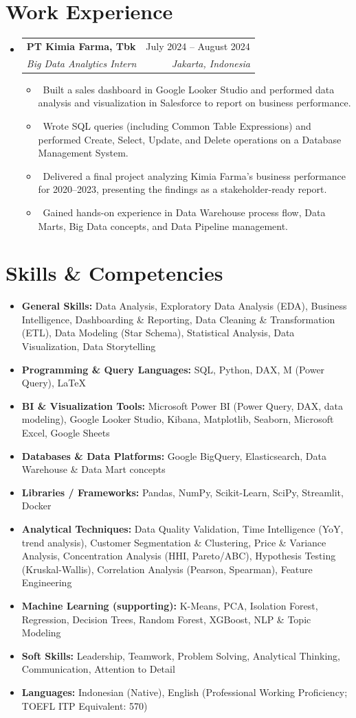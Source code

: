 \documentclass[letterpaper,10pt]{article}
\makeatletter
\newcommand{\resumeItem}[1]{\item\small{#1}}
\newcommand{\resumeSubheading}[4]{
\vspace{-1pt}\item
  \begin{tabular*}{0.97\textwidth}[t]{l@{\extracolsep{\fill}}r}
    \textbf{#1} & #2 \\
    \textit{#3} & \textit{#4} \\
  \end{tabular*}\vspace{-7pt}
}
\newcommand{\resumeSubHeadingList}{\begin{itemize}[leftmargin=0.15in, label={}]}
\newcommand{\resumeSubHeadingListEnd}{\end{itemize}}
\makeatother
\begin{document}
\section{Work Experience}
\resumeSubHeadingList
  \resumeSubheading
      {PT Kimia Farma, Tbk}{July 2024 -- August 2024}
      {Big Data Analytics Intern}{Jakarta, Indonesia}
      \resumeSubHeadingList
          \resumeItem{\textbullet\ Built a sales dashboard in Google Looker Studio and performed data analysis and visualization in Salesforce to report on business performance.}
          \resumeItem{\textbullet\ Wrote SQL queries (including Common Table Expressions) and performed Create, Select, Update, and Delete operations on a Database Management System.}
          \resumeItem{\textbullet\ Delivered a final project analyzing Kimia Farma's business performance for 2020--2023, presenting the findings as a stakeholder-ready report.}
          \resumeItem{\textbullet\ Gained hands-on experience in Data Warehouse process flow, Data Marts, Big Data concepts, and Data Pipeline management.}
      \resumeSubHeadingListEnd
\resumeSubHeadingListEnd

\section{Skills \& Competencies}
\resumeSubHeadingList
  \resumeItem{\textbf{General Skills:} Data Analysis, Exploratory Data Analysis (EDA), Business Intelligence, Dashboarding \& Reporting, Data Cleaning \& Transformation (ETL), Data Modeling (Star Schema), Statistical Analysis, Data Visualization, Data Storytelling}
  \resumeItem{\textbf{Programming \& Query Languages:} SQL, Python, DAX, M (Power Query), LaTeX}
  \resumeItem{\textbf{BI \& Visualization Tools:} Microsoft Power BI (Power Query, DAX, data modeling), Google Looker Studio, Kibana, Matplotlib, Seaborn, Microsoft Excel, Google Sheets}
  \resumeItem{\textbf{Databases \& Data Platforms:} Google BigQuery, Elasticsearch, Data Warehouse \& Data Mart concepts}
  \resumeItem{\textbf{Libraries / Frameworks:} Pandas, NumPy, Scikit-Learn, SciPy, Streamlit, Docker}
  \resumeItem{\textbf{Analytical Techniques:} Data Quality Validation, Time Intelligence (YoY, trend analysis), Customer Segmentation \& Clustering, Price \& Variance Analysis, Concentration Analysis (HHI, Pareto/ABC), Hypothesis Testing (Kruskal-Wallis), Correlation Analysis (Pearson, Spearman), Feature Engineering}
  \resumeItem{\textbf{Machine Learning (supporting):} K-Means, PCA, Isolation Forest, Regression, Decision Trees, Random Forest, XGBoost, NLP \& Topic Modeling}
  \resumeItem{\textbf{Soft Skills:} Leadership, Teamwork, Problem Solving, Analytical Thinking, Communication, Attention to Detail}
  \resumeItem{\textbf{Languages:} Indonesian (Native), English (Professional Working Proficiency; TOEFL ITP Equivalent: 570)}
\resumeSubHeadingListEnd
\end{document}
